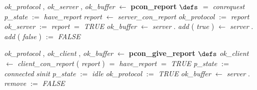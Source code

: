 \begin{tabbing}
\bSetTabs
\+\>
%
%
{\em ok\_protocol\/} , {\em ok\_server\/} , {\em ok\_buffer\/} $\longleftarrow$  {\bf { pcon\_report}}  \bhsp $\defs$ \+ \bnl
   $=$ {\em conrequest\/} \- \bhsp {} \+\bnl
{\em p\_state\/} $:=$  {\em have\_report\/} \bparallel \bnl
{\em report\/} $\longleftarrow$ {\em server\_con\_report\/}\label{server_con_report}  \bparallel \bnl
{\em ok\_protocol\/} $:=$  {\em report\/} \bparallel \bnl
{\em ok\_server\/} $:=$  {\em report\/} \bparallel \bnl
{}  $=$ {\em TRUE\/} \- \bhsp {} \+\bnl
{\em ok\_buffer\/} $\longleftarrow$ {\em server\/} . {\em add\/}\label{add}  ( {\em true\/} )  \-\bnl
{}  $\longleftarrow$ {\em server\/} . {\em add\/}\label{add}  ( {\em false\/} )  \-\bnl
{}  \-\bnl
{}  $:=$  {\em FALSE\/} \-\bnl
{}  \- \bOperationSemiColon 
\end{tabbing}
\bresetindent
%
%
\vspace{-4.5ex}\bsetindent
\begin{tabbing}
\bSetTabs
\+\>
%
%
{\em ok\_protocol\/} , {\em ok\_client\/} , {\em ok\_buffer\/} $\longleftarrow$  {\bf { pcon\_give\_report}}  \bhsp $\defs$ \+ \bnl
  \+\bnl
{\em ok\_client\/} $\longleftarrow$ {\em client\_con\_report\/}\label{client_con_report}  ( {\em report\/} )  \bparallel \bnl
{}  $=$ {\em have\_report\/} \- \bhsp {} \+\bnl
{}  $=$ {\em TRUE\/} \- \bhsp {} \+\bnl
{\em p\_state\/} $:=$  {\em connected\/} \-\bnl
{} \+\bnl
{\em sinit\/}\label{sinit}  \bparallel \bnl
{\em p\_state\/} $:=$  {\em idle\/} \-\bnl
{}  \bparallel \bnl
{\em ok\_protocol\/} $:=$  {\em TRUE\/} \bparallel \bnl
{\em ok\_buffer\/} $\longleftarrow$ {\em server\/} . {\em remove\/}\label{remove}  \-\bnl
{}  $:=$  {\em FALSE\/} \-\bnl
{}  \-\bnl
{}  \- \bOperationSemiColon 
\end{tabbing}
